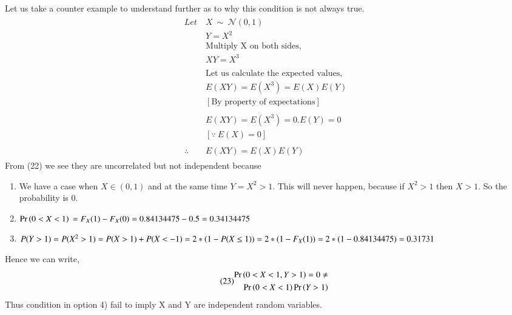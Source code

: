 \documentclass[journal,12pt,twocolumn]{IEEEtran}
\begin{document}
\begin{enumerate}
Let us take a counter example to understand further as to why this condition is not always true.\\
\begin{align}\tag{22}
    \begin{split}
        Let\ &X\ \sim\ \mathcal{N}(0, 1)\\
        &Y = X^2\\
        &\text{Multiply\ X\ on\ both\ sides},\\
        &XY = X^3\\
        \\
        &\text{Let\ us\ calculate\ the\ expected\ values},\\
        &E(XY) = E(X^3) = E(X)E(Y)\\
        &[\text{By\ property\ of\ expectations}]\\
        \\
        &E(XY) = E(X^3) = 0.E(Y) = 0\\
        &[\because\ E(X) = 0]\\
        \\
        \therefore\ &E(XY) = E(X)E(Y)
    \end{split}
\end{align}
From (22) we see they are uncorrelated but not independent because\\
\begin{enumerate}
    \item We have a case when $X \in (0,1)$ and at the same time $Y=X^2>1$. This will never happen, because if $X^2 > 1$ then $X>1$. So the probability is $0$.\\ 
    \item $\Pr\left(0<X<1\right)\\= F_X(1) - F_X(0)\\ = 0.84134475-0.5\\ = 0.34134475$\\
    \item $P(Y>1)\\=P(X^2>1)\\=P(X>1)+P(X<-1)\\=2*(1-P(X\leq 1))\\=2*(1-F_X(1))\\=2*(1-0.84134475)=0.31731$\\
\end{enumerate}
Hence we can write,
\begin{align}\tag{23}
    \begin{split}
        \Pr\left(0<X<1,Y>1\right) = 0 \neq\\
        \Pr\left(0<X<1\right)\Pr\left(Y>1\right)
    \end{split}
\end{align}
Thus condition in option 4) fail to imply X and Y are independent random variables.
\end{enumerate}
\end{document}
